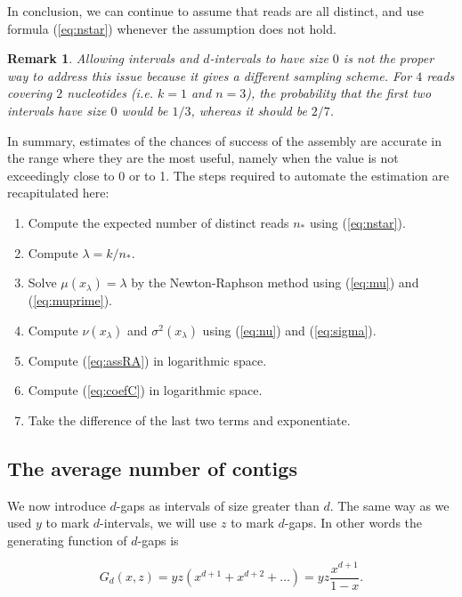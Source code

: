 \documentclass{article}
\newtheorem*{remark}{Remark}
\begin{document}
In conclusion, we can continue to assume that reads are all distinct, and
use formula (\ref{eq:nstar}) whenever the assumption does not hold.

\begin{remark}
Allowing intervals and $d$-intervals to have size $0$ is not the proper
way to address this issue because it gives a different sampling scheme.
For $4$ reads covering $2$ nucleotides (\textit{i.e.} $k=1$ and $n=3$),
the probability that the first two intervals have size $0$ would be $1/3$,
whereas it should be $2/7$.
\end{remark}

In summary, estimates of the chances of success of the assembly are
accurate in the range where they are the most useful, namely when the
value is not exceedingly close to 0 or to 1. The steps required to
automate the estimation are recapitulated here:

\begin{enumerate}
\item Compute the expected number of distinct reads $n_*$ using
(\ref{eq:nstar}). 
\item Compute $\lambda = k/n_*$.
\item Solve $\mu(x_\lambda) = \lambda$ by the Newton-Raphson method using
(\ref{eq:mu}) and (\ref{eq:muprime}).
\item Compute $\nu(x_\lambda)$ and $\sigma^2(x_\lambda)$ using
(\ref{eq:nu}) and (\ref{eq:sigma}).
\item Compute (\ref{eq:assRA}) in logarithmic space.
\item Compute (\ref{eq:coefC}) in logarithmic space.
\item Take the difference of the last two terms and exponentiate.
\end{enumerate}

\subsection{The average number of contigs}
\label{sec:av}

We now introduce $d$-gaps as intervals of size greater than $d$. The same
way as we used $y$ to mark $d$-intervals, we will use $z$ to mark
$d$-gaps. In other words the generating function of $d$-gaps is

\begin{equation*}
G_d(x,z) = yz(x^{d+1}+x^{d+2}+\ldots) = yz\frac{x^{d+1}}{1-x}.
\end{equation*}
\end{document}
